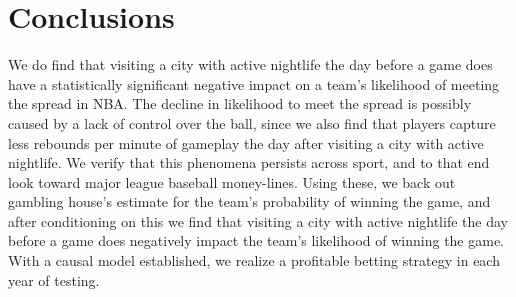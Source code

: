 \documentclass[letterpaper,12pt]{article}
\begin{document}
\section{Conclusions}
We do find that visiting a city with active nightlife the day before a game does have 
a statistically significant negative impact on a team's likelihood of meeting the spread in NBA.
The decline in likelihood to meet the spread is possibly caused by a lack of control over the ball,
since we also find that players capture less rebounds per minute of gameplay the day after
visiting a city with active nightlife. We verify that this phenomena persists across sport, and 
to that end look toward major league baseball money-lines. Using these, we back out gambling
house's estimate for the team's probability of winning the game, and after conditioning on this
we find that visiting a city with active nightlife the day before a game does negatively 
impact the team's likelihood of winning the game.
With a causal model established, we realize a profitable betting strategy in each year of testing.



\end{document}
